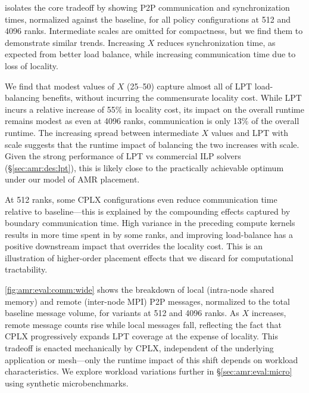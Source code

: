 
\enlargethispage{\baselineskip}
\noindent{} isolates the core tradeoff by showing P2P communication
and synchronization times, normalized against the baseline, for all policy configurations at 512 and 4096 ranks.
Intermediate scales are omitted for compactness, but we find them to demonstrate similar trends.
Increasing $X$ reduces synchronization time, as expected from better load balance, while increasing
communication time due to loss of locality.

We find that modest values of $X$ (25--50) capture almost all of LPT load-balancing benefits,
without incurring the commensurate locality cost.
While LPT incurs a relative increase of 55\% in locality cost, its impact on the overall runtime
remains modest as even at 4096 ranks, communication is only 13\% of the overall runtime.
The increasing spread between intermediate $X$ values and LPT with scale suggests that the runtime
impact of balancing the two increases with scale.
Given the strong performance of LPT vs commercial ILP solvers (\S\ref{sec:amr:des:lpt}), this is likely
close to the practically achievable optimum under our model of AMR placement.

At 512 ranks, some CPLX configurations even reduce communication time relative to baseline---this
is explained by the compounding effects captured by boundary communication time.
High variance in the preceding compute kernels results in more time spent in \mpiw{} by some ranks,
and improving load-balance has a positive downstream impact that overrides the locality cost.
This is an illustration of higher-order placement effects that we discard for computational
tractability.

\figAmrEvalComm


\noindent\cref{fig:amr:eval:comm:wide} shows the breakdown of local (intra-node shared memory) and
remote (inter-node MPI) P2P messages, normalized to the total baseline message volume,
for \cplx{} variants at 512 and 4096 ranks.
As $X$ increases, remote message counts rise while local messages fall, reflecting the fact that
CPLX progressively expands LPT coverage at the expense of locality.
This tradeoff is enacted mechanically by CPLX, independent of the underlying application or
mesh---only the runtime impact of this shift depends on workload characteristics.
We explore workload variations further in \S\ref{sec:amr:eval:micro} using synthetic microbenchmarks.

